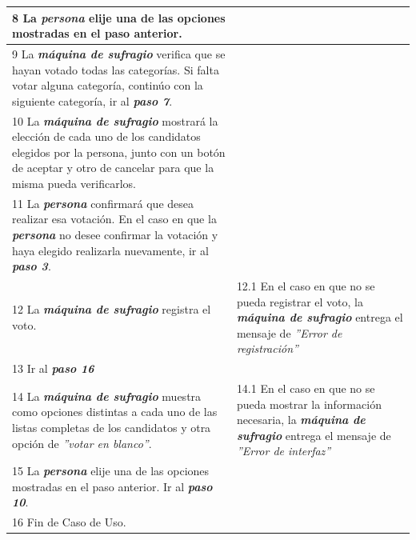 \documentclass[spanish, 10pt,a4paper]{article}
\numberwithin{equation}{section} %
\begin{document}
\begin{table}[H]
\begin{tabular}{p{9cm} | p{7cm}}
    \hline
    8 La \textbf{\textit{persona}} elije una de las opciones mostradas en el paso anterior.
    & \\
    
    \hline
    9 La \textbf{\textit{máquina de sufragio}} verifica que se hayan votado todas las categorías. Si falta votar alguna categoría, continúo con la siguiente categoría, ir al \textbf{\textit{paso 7}}.
    & \\
    
    \hline
    10 La \textbf{\textit{máquina de sufragio}} mostrará la elección de cada uno de los candidatos elegidos por la persona, junto con un botón de aceptar y otro de cancelar para que la misma pueda verificarlos.
    & \\
    
    \hline
    11 La \textbf{\textit{persona}} confirmará que desea realizar esa votación.
     En el caso en que la \textbf{\textit{persona}} no desee confirmar la votación y haya elegido realizarla nuevamente, ir al \textbf{\textit{paso 3}}.\\
    
    \hline
    12 La \textbf{\textit{máquina de sufragio}} registra el voto.
    & 
    12.1 En el caso en que no se pueda registrar el voto, la \textbf{\textit{máquina de sufragio}} entrega el mensaje de \textit{''Error de registración''}
    \\
    
    \hline
    13 Ir al  \textbf{\textit{paso 16}}
    & \\
    
    \hline
    14 La \textbf{\textit{máquina de sufragio}} muestra como opciones distintas a cada uno de las listas completas de los candidatos y otra opción de \textit{''votar en blanco''}.
    & 
    14.1 En el caso en que no se pueda mostrar la información necesaria, la \textbf{\textit{máquina de sufragio}} entrega el mensaje de \textit{''Error de interfaz''}
    \\
    
    \hline
    15 La \textbf{\textit{persona}} elije una de las opciones mostradas en el paso anterior. Ir al \textbf{\textit{paso 10}}.
    & \\
    \hline

    \hline
    16 Fin de Caso de Uso.
    & \\
  \end{tabular}
\egroup
\end{table}
\end{document}
